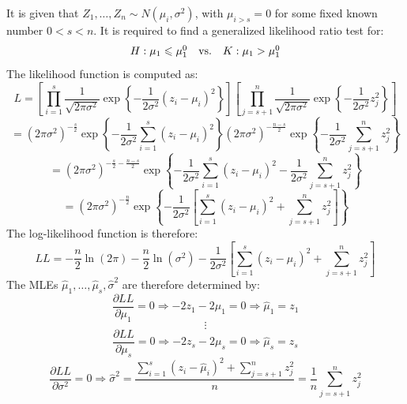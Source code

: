 \begin{homeworkProblem}
It is given that $Z_1 , \ldots ,Z_n \sim N\left( {\mu _i ,\sigma ^2 } 
\right)$, with $\mu _{i > s}  = 0$ for some fixed known number 
$0<s<n$. It is required to find a generalized likelihood ratio test 
for:
\[
\begin{array}{*{20}c}
   {H:\mu _1  \leqslant \mu _1^0 } & {{\text{vs}}{\text{.}}} & {K:\mu 
_1  > \mu _1^0 }  \\

 \end{array} 
\]
The likelihood function is computed as:
\[
L = \left[ {\prod\limits_{i = 1}^s {\frac{1}
{{\sqrt {2\pi \sigma ^2 } }}\exp \left\{ { - \frac{1}
{{2\sigma ^2 }}\left( {z_i  - \mu _i } \right)^2 } \right\}} } 
\right]\left[ {\prod\limits_{j = s + 1}^n {\frac{1}
{{\sqrt {2\pi \sigma ^2 } }}\exp \left\{ { - \frac{1}
{{2\sigma ^2 }}z_j^2 } \right\}} } \right]
\]
\[
 = \left( {2\pi \sigma ^2 } \right)^{ - \frac{s}
{2}} \exp \left\{ { - \frac{1}
{{2\sigma ^2 }}\sum\limits_{i = 1}^s {\left( {z_i  - \mu _i } 
\right)^2 } } \right\}\left( {2\pi \sigma ^2 } \right)^{ - \frac{{n - 
s}}
{2}} \exp \left\{ { - \frac{1}
{{2\sigma ^2 }}\sum\limits_{j = s + 1}^n {z_j^2 } } \right\}
\]
\[
 = \left( {2\pi \sigma ^2 } \right)^{ - \frac{s}
{2} - \frac{{n - s}}
{2}} \exp \left\{ { - \frac{1}
{{2\sigma ^2 }}\sum\limits_{i = 1}^s {\left( {z_i  - \mu _i } 
\right)^2  - \frac{1}
{{2\sigma ^2 }}\sum\limits_{j = s + 1}^n {z_j^2 } } } \right\}
\]
\[
 = \left( {2\pi \sigma ^2 } \right)^{ - \frac{n}
{2}} \exp \left\{ { - \frac{1}
{{2\sigma ^2 }}\left[ {\sum\limits_{i = 1}^s {\left( {z_i  - \mu _i } 
\right)^2 }  + \sum\limits_{j = s + 1}^n {z_j^2 } } \right]} \right\}
\]
The log-likelihood function is therefore:
\[
LL =  - \frac{n}
{2}\ln \left( {2\pi } \right) - \frac{n}
{2}\ln \left( {\sigma ^2 } \right) - \frac{1}
{{2\sigma ^2 }}\left[ {\sum\limits_{i = 1}^s {\left( {z_i  - \mu _i } 
\right)^2 }  + \sum\limits_{j = s + 1}^n {z_j^2 } } \right]
\]
The MLEs $\hat \mu _1 , \ldots ,\hat \mu _s ,\hat \sigma ^2$ are 
therefore determined by:
\[
\frac{{\partial LL}}
{{\partial \mu _1 }} = 0 \Rightarrow  - 2z_1  - 2\mu _1  = 0 
\Rightarrow \hat \mu _1  = z_1 
\]
\[
 \vdots 
\]
\[
\frac{{\partial LL}}
{{\partial \mu _s }} = 0 \Rightarrow  - 2z_s  - 2\mu _s  = 0 
\Rightarrow \hat \mu _s  = z_s 
\]
\[
\frac{{\partial LL}}
{{\partial \sigma ^2 }} = 0 \Rightarrow \hat \sigma ^2  = 
\frac{{\sum\limits_{i = 1}^s {\left( {z_i  - \hat \mu _i } \right)^2 }  
+ \sum\limits_{j = s + 1}^n {z_j^2 } }}
{n} = \frac{1}
{n}\sum\limits_{j = s + 1}^n {z_j^2 } 
\]
\end{homeworkProblem}
